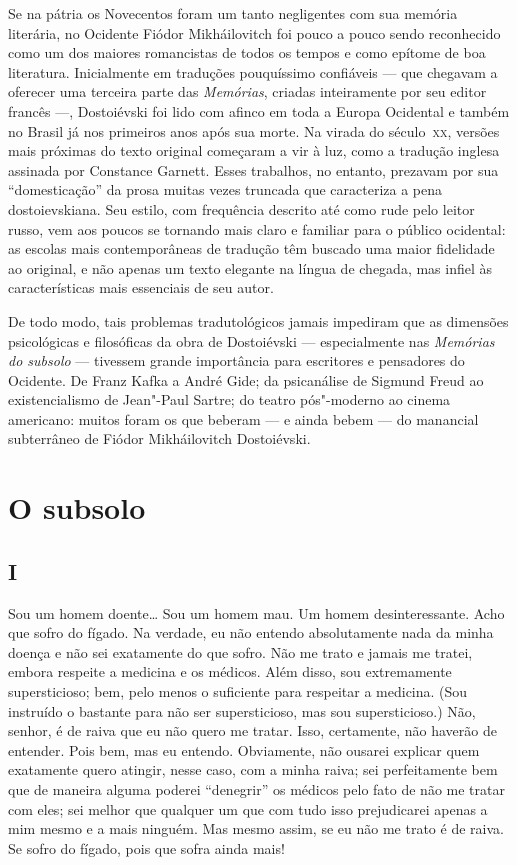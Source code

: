 Se na pátria os Novecentos foram um tanto negligentes com sua memória
literária, no Ocidente Fiódor Mikháilovitch foi pouco a pouco sendo reconhecido
como um dos maiores romancistas de todos os tempos e como epítome de boa
literatura. Inicialmente em traduções pouquíssimo confiáveis --- que chegavam a
oferecer uma terceira parte das \textit{Memórias}, criadas inteiramente por seu
editor francês ---, Dostoiévski foi lido com afinco em toda a Europa Ocidental e
também no Brasil já nos primeiros anos após sua morte. Na virada do século~\textsc{xx},
versões mais próximas do texto original começaram a vir à luz, como a tradução
inglesa assinada por Constance Garnett. Esses trabalhos, no
entanto, prezavam por sua “domesticação” da prosa muitas vezes truncada que
caracteriza a pena dostoievskiana. Seu estilo, com frequência descrito até
como rude pelo leitor russo, vem aos poucos se tornando mais claro e familiar
para o público ocidental: as escolas mais contemporâneas de tradução têm
buscado uma maior fidelidade ao original, e não apenas um texto elegante na
língua de chegada, mas infiel às características mais essenciais de seu autor.

De todo modo, tais problemas tradutológicos jamais impediram que as dimensões
psicológicas e filosóficas da obra de Dostoiévski --- especialmente nas
\textit{Memórias do subsolo} --- tivessem grande importância para escritores e
pensadores do Ocidente. De Franz Kafka a André Gide; da
psicanálise de Sigmund Freud ao existencialismo de Jean"-Paul Sartre; 
do teatro pós"-moderno ao cinema americano: muitos foram os que
beberam --- e ainda bebem --- do manancial subterrâneo de Fiódor Mikháilovitch
Dostoiévski.

\chapter{O subsolo}

\section{I}

Sou um homem doente\ldots{} Sou um homem mau. Um homem desinteressante. Acho
que sofro do fígado. Na verdade, eu não entendo absolutamente nada da
minha doença e não sei exatamente do que sofro. Não me trato e jamais
me tratei, embora respeite a medicina e os médicos. Além disso, sou
extremamente supersticioso; bem, pelo menos o suficiente para respeitar
a medicina. (Sou instruído o bastante para não ser supersticioso, mas
sou supersticioso.) Não, senhor, é de raiva que eu não quero me tratar.
Isso, certamente, não haverão de entender. Pois bem, mas eu entendo.
Obviamente, não ousarei explicar quem exatamente quero atingir, nesse
caso, com a minha raiva; sei perfeitamente bem que de maneira alguma
poderei “denegrir” os médicos pelo fato de não me tratar com eles; sei
melhor que qualquer um que com tudo isso prejudicarei apenas a mim
mesmo e a mais ninguém. Mas mesmo assim, se eu não me trato é de raiva.
Se sofro do fígado, pois que sofra ainda mais!

